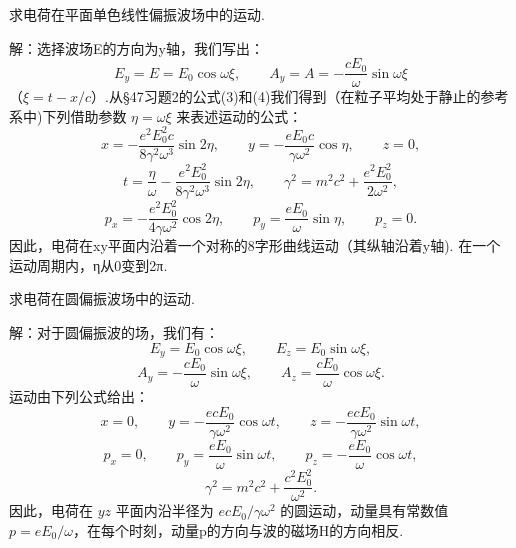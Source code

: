 \begin{xiti}
\quad 求电荷在平面单色线性偏振波场中的运动.

解：选择波场E的方向为y轴，我们写出：
\begin{equation*}
  E_y=E=E_0\cos\omega\xi,\qquad
  A_y=A=-\frac{cE_0}{\omega}\sin\omega\xi
\end{equation*}
（$\xi = t - x/c$）.从§47习题2的公式(3)和(4)我们得到（在粒子平均处于静止的参考系中)下列借助参数 $\eta = \omega\xi$ 来表述运动的公式：
\begin{equation*}
  x=-\frac{e^2E_0^2c}{8\gamma^2\omega^3}\sin 2\eta,\qquad
  y=-\frac{eE_0c}{\gamma\omega^2}\cos\eta,\qquad
  z=0,
\end{equation*}
\begin{equation*}
  t=\frac{\eta}{\omega}-\frac{e^2E_0^2}{8\gamma^2\omega^3}\sin 2\eta,\qquad
  \gamma^2=m^2c^2+\frac{e^2E_0^2}{2\omega^2},
\end{equation*}
\begin{equation*}
  p_x=-\frac{e^2E_0^2}{4\gamma\omega^2}\cos 2\eta,\qquad
  p_y=\frac{eE_0}{\omega}\sin\eta,\qquad
  p_z=0.
\end{equation*}
因此，电荷在xy平面内沿着一个对称的8字形曲线运动（其纵轴沿着y轴). 在一个运动周期内，η从0变到2π.

\quad 求电荷在圆偏振波场中的运动.

解：对于圆偏振波的场，我们有：
\begin{equation*}
  E_y=E_0\cos\omega\xi,\qquad
  E_z=E_0\sin\omega\xi,
\end{equation*}
\begin{equation*}
  A_y=-\frac{cE_0}{\omega}\sin\omega\xi,\qquad
  A_z=\frac{cE_0}{\omega}\cos\omega\xi.
\end{equation*}
运动由下列公式给出：
\begin{equation*}
  x=0,\qquad
  y=-\frac{ecE_0}{\gamma\omega^2}\cos\omega t,\qquad
  z=-\frac{ecE_0}{\gamma\omega^2}\sin\omega t,
\end{equation*}
\begin{equation*}
  p_x=0,\qquad
  p_y=\frac{eE_0}{\omega}\sin\omega t,\qquad
  p_z=-\frac{eE_0}{\omega}\cos\omega t,
\end{equation*}
\begin{equation*}
  \gamma^2=m^2c^2+\frac{c^2E_0^2}{\omega^2}.
\end{equation*}
因此，电荷在 $yz$ 平面内沿半径为 $ecE_0/\gamma\omega^2$ 的圆运动，动量具有常数值 $p = eE_0/\omega$，在每个时刻，动量p的方向与波的磁场H的方向相反.

\end{xiti}

